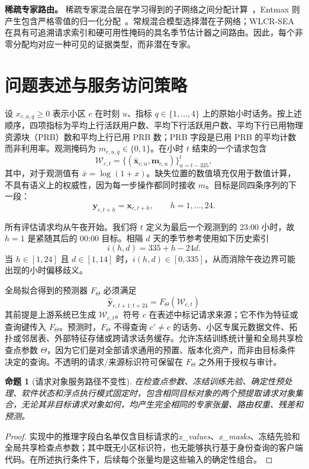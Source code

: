 \documentclass[10pt,conference,letterpaper]{IEEEtran}
\newtheorem{proposition}{命题}
\begin{document}
\textbf{稀疏专家路由。}
稀疏专家混合层在学习得到的子网络之间分配计算~\cite{shazeer2017moe}，Entmax 则产生包含严格零值的归一化分配~\cite{peters2019sparse}。常规混合模型选择潜在子网络；WLCR-SEA 在具有可追溯请求索引和硬可用性掩码的具名季节估计器之间路由。因此，每个非零分配均对应一种可见的证据类型，而非潜在专家。

\section{问题表述与服务访问策略}
设 $x_{c,u,q}\geq0$ 表示小区 $c$ 在时刻 $u$、指标 $q\in\{1,\ldots,4\}$ 上的原始小时话务。按上述顺序，四项指标为平均上行活跃用户数、平均下行活跃用户数、平均下行已用物理资源块（PRB）数和平均上行已用 PRB 数；PRB 字段是已用 PRB 的平均计数而非利用率。观测掩码为 $m_{c,u,q}\in\{0,1\}$。在小时 $t$ 结束的一个请求包含
\begin{equation}
\mathcal W_{c,t}=\{(\bar{\mathbf x}_{c,u},\mathbf m_{c,u})\}_{u=t-335}^{t},
\end{equation}
其中，对于观测值有 $\bar x=\log(1+x)$。缺失位置的数值填充仅用于数值计算，不具有语义上的权威性，因为每一步操作都同时接收 $m$。目标是同四条序列的下一段：
\begin{equation}
\mathbf y_{c,t+h}=\mathbf x_{c,t+h},\qquad h=1,\ldots,24.
\end{equation}

所有评估请求均从午夜开始。我们将 $t$ 定义为最后一个观测到的 23:00 小时，故 $h=1$ 是紧随其后的 00:00 目标。相隔 $d$ 天的季节参考使用如下历史索引
\begin{equation}
i(h,d)=335+h-24d.
\end{equation}
当 $h\in[1,24]$ 且 $d\in[1,14]$ 时，$i(h,d)\in[0,335]$，从而消除午夜边界可能出现的小时偏移歧义。

全局拟合得到的预测器 $F_{\Theta}$ 必须满足
\begin{equation}
\widehat{\mathbf y}_{c,t+1:t+24}=F_{\Theta}(\mathcal W_{c,t})
\end{equation}
其前提是上游系统已生成 $\mathcal W_{c,t}$。符号 $c$ 在表述中标记请求来源；它不作为特征或查询键传入 $F_{\Theta}$。预测时，$F_{\Theta}$ 不得查询 $c'\neq c$ 的话务、小区专属元数据文件、拓扑或邻居表、外部特征存储或跨请求话务缓存。允许冻结训练统计量和全局共享检查点参数 $\Theta$，因为它们是对全部请求通用的预置、版本化资产，而非由目标条件决定的查询。不透明的请求/来源标识符可保留在 $F_{\Theta}$ 之外用于授权与审计。

\begin{proposition}[请求对象服务路径不变性]
在检查点参数、冻结训练先验、确定性预处理、软件状态和浮点执行模式固定时，包含相同目标对象的两个预提取请求对象集合，无论其非目标请求对象如何，均产生完全相同的专家张量、路由权重、残差和预测。
\end{proposition}
\begin{proof}
实现中的推理字段白名单仅含目标请求的\textit{x\_values}、\textit{x\_masks}、冻结先验和全局共享检查点参数；其中既无小区标识符，也无能够执行基于身份查询的客户端代码。在所述执行条件下，后续每个张量均是这些输入的确定性组合。
\end{proof}
\end{document}

